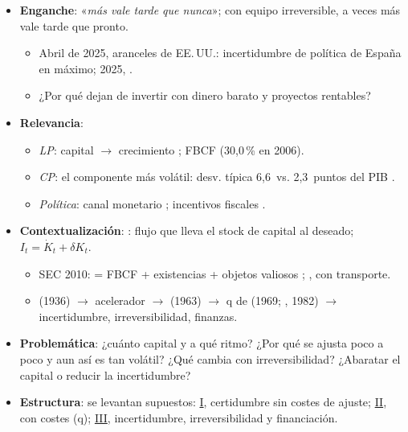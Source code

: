 \documentclass{article}
\begin{document}
\cabecerarepaso
\begin{columnas}

\begin{itemize}
\item \textbf{Enganche}: «\emph{más vale tarde que nunca}»; con equipo irreversible, a veces más vale tarde que pronto.
  \begin{itemize}
  \item Abril de 2025, aranceles de EE.\,UU.: incertidumbre de política de España en máximo; 2025, .
  \item ¿Por qué dejan de invertir con dinero barato y proyectos rentables?
  \end{itemize}
\item \textbf{Relevancia}:
  \begin{itemize}
  \item \emph{LP}: capital $\to$ crecimiento ; FBCF  (30,0\,\% en 2006).
  \item \emph{CP}: el componente más volátil: desv. típica 6,6~vs. 2,3~puntos del PIB .
  \item \emph{Política}: canal monetario ; incentivos fiscales .
  \end{itemize}
\item \textbf{Contextualización}: : flujo que lleva el stock de capital al deseado; $I_t=\dot K_t+\delta K_t$.
  \begin{itemize}
  \item SEC 2010:  = FBCF + existencias + objetos valiosos ; , con transporte.
  \item {} (1936) $\to$ acelerador $\to$  (1963) $\to$ q de  (1969; , 1982) $\to$ incertidumbre, irreversibilidad, finanzas.
  \end{itemize}
\item \textbf{Problemática}: ¿cuánto capital y a qué ritmo? ¿Por qué se ajusta poco a poco y aun así es tan volátil? ¿Qué cambia con irreversibilidad? ¿Abaratar el capital o reducir la incertidumbre?
\item \textbf{Estructura}: se levantan supuestos: \hyperref[rep:I]{I}, certidumbre sin costes de ajuste; \hyperref[rep:II]{II}, con costes (q); \hyperref[rep:III]{III}, incertidumbre, irreversibilidad y financiación.
\end{itemize}


\end{columnas}
\end{document}
